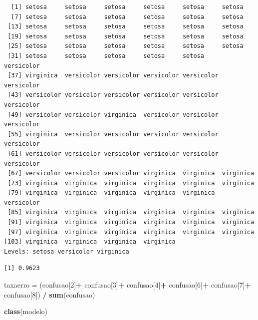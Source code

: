 \documentclass[12pt,brazil,oneside]{book}
\newenvironment{Shaded}{\begin{snugshade}}{\end{snugshade}}
\newcommand{\DecValTok}[1]{\textcolor[rgb]{0.00,0.00,0.81}{#1}}
\newcommand{\KeywordTok}[1]{\textcolor[rgb]{0.13,0.29,0.53}{\textbf{#1}}}
\newcommand{\NormalTok}[1]{#1}
\newcommand{\OperatorTok}[1]{\textcolor[rgb]{0.81,0.36,0.00}{\textbf{#1}}}
\newcommand{\StringTok}[1]{\textcolor[rgb]{0.31,0.60,0.02}{#1}}
\begin{document}
\begin{verbatim}
  [1] setosa     setosa     setosa     setosa     setosa     setosa    
  [7] setosa     setosa     setosa     setosa     setosa     setosa    
 [13] setosa     setosa     setosa     setosa     setosa     setosa    
 [19] setosa     setosa     setosa     setosa     setosa     setosa    
 [25] setosa     setosa     setosa     setosa     setosa     setosa    
 [31] setosa     setosa     setosa     setosa     setosa     versicolor
 [37] virginica  versicolor versicolor versicolor versicolor versicolor
 [43] versicolor versicolor versicolor versicolor versicolor versicolor
 [49] versicolor versicolor virginica  versicolor versicolor versicolor
 [55] virginica  versicolor versicolor versicolor versicolor versicolor
 [61] versicolor versicolor versicolor versicolor versicolor versicolor
 [67] versicolor versicolor versicolor virginica  virginica  virginica 
 [73] virginica  virginica  virginica  virginica  virginica  virginica 
 [79] virginica  virginica  virginica  virginica  virginica  versicolor
 [85] virginica  virginica  virginica  virginica  virginica  virginica 
 [91] virginica  virginica  virginica  virginica  virginica  virginica 
 [97] virginica  virginica  virginica  virginica  virginica  virginica 
[103] virginica  virginica  virginica  virginica 
Levels: setosa versicolor virginica
\end{verbatim}

\begin{Shaded}
\end{Shaded}

\begin{verbatim}
[1] 0.9623
\end{verbatim}

\begin{Shaded}
\begin{Highlighting}[]
\NormalTok{taxaerro =}\StringTok{ }\NormalTok{(confusao[}\DecValTok{2}\NormalTok{]}\OperatorTok{+}\StringTok{ }
\StringTok{            }\NormalTok{confusao[}\DecValTok{3}\NormalTok{]}\OperatorTok{+}
\StringTok{            }\NormalTok{confusao[}\DecValTok{4}\NormalTok{]}\OperatorTok{+}
\StringTok{            }\NormalTok{confusao[}\DecValTok{6}\NormalTok{]}\OperatorTok{+}
\StringTok{            }\NormalTok{confusao[}\DecValTok{7}\NormalTok{]}\OperatorTok{+}
\StringTok{            }\NormalTok{confusao[}\DecValTok{8}\NormalTok{]) }\OperatorTok{/}\StringTok{ }\KeywordTok{sum}\NormalTok{(confusao)}

\KeywordTok{class}\NormalTok{(modelo)}
\end{Highlighting}
\end{Shaded}
\end{document}
